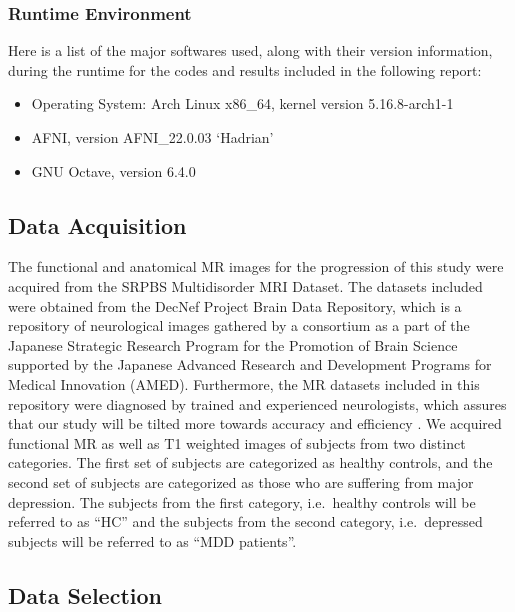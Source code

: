 \documentclass[12pt]{article}
\begin{document}
\subsubsection{Runtime Environment}%
\label{ssub:runtime_environment}

Here is a list of the major softwares used, along with their version
information, during the runtime for the codes and results included in
the following report:

\begin{itemize}[noitemsep]
  \item Operating System: Arch Linux x86\_64, kernel version
    5.16.8-arch1-1
  \item AFNI, version AFNI\_22.0.03 `Hadrian'
  \item GNU Octave, version 6.4.0


\end{itemize}

\subsection{Data Acquisition}%
\label{sub:data_acquisition}

The functional and anatomical MR images for the progression of this
study were acquired from the SRPBS Multidisorder MRI Dataset. The
datasets included were obtained from the DecNef Project Brain Data
Repository, which is a repository of neurological images gathered by a
consortium as a part of the Japanese Strategic Research Program for
the Promotion of Brain Science supported by the Japanese Advanced
Research and Development Programs for Medical Innovation (AMED).
Furthermore, the MR datasets included in this repository were
diagnosed by trained and experienced neurologists, which assures that
our study will be tilted more towards accuracy and efficiency
\cite{dataset}. We acquired functional MR as well as T1 weighted
images of subjects from two distinct categories. The first set of
subjects are categorized as healthy controls, and the second set of
subjects are categorized as those who are suffering from major
depression. The subjects from the first category, i.e.~healthy
controls will be referred to as ``HC'' and the subjects from the
second category, i.e.~depressed subjects will be referred to as ``MDD
patients''.

\subsection{Data Selection}%
\label{sub:data_selection}
\end{document}
